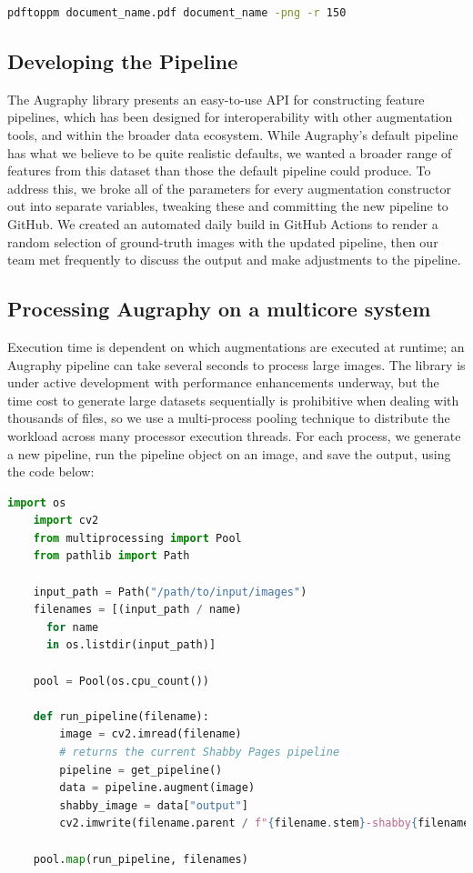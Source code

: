 \documentclass[runningheads]{llncs}
\begin{document}
\begin{lstlisting}[language=bash]
  pdftoppm document_name.pdf document_name -png -r 150
\end{lstlisting}

\subsection{Developing the Pipeline}
The Augraphy library presents an easy-to-use API for constructing feature pipelines, which has been designed for interoperability with other augmentation tools, and within the broader data ecosystem. While Augraphy's default pipeline has what we believe to be quite realistic defaults, we wanted a broader range of features from this dataset than those the default pipeline could produce. To address this, we broke all of the parameters for every augmentation constructor out into separate variables, tweaking these and committing the new pipeline to GitHub. We created an automated daily build in GitHub Actions to render a random selection of ground-truth images with the updated pipeline, then our team met frequently to discuss the output and make adjustments to the pipeline.

\subsection{Processing Augraphy on a multicore system}
Execution time is dependent on which augmentations are executed at runtime; an Augraphy pipeline can take several seconds to process large images. The library is under active development with performance enhancements underway, but the time cost to generate large datasets sequentially is prohibitive when dealing with thousands of files, so we use a multi-process pooling technique to distribute the workload across many processor execution threads. For each process, we generate a new pipeline, run the pipeline object on an image, and save the output, using the code below:

\begin{lstlisting}[language=Python]
    import os
    import cv2
    from multiprocessing import Pool
    from pathlib import Path

    input_path = Path("/path/to/input/images")
    filenames = [(input_path / name)
      for name
      in os.listdir(input_path)]

    pool = Pool(os.cpu_count())

    def run_pipeline(filename):
        image = cv2.imread(filename)
        # returns the current Shabby Pages pipeline
        pipeline = get_pipeline()
        data = pipeline.augment(image)
        shabby_image = data["output"]
        cv2.imwrite(filename.parent / f"{filename.stem}-shabby{filename.suffix}")

    pool.map(run_pipeline, filenames)

\end{lstlisting}
\end{document}
